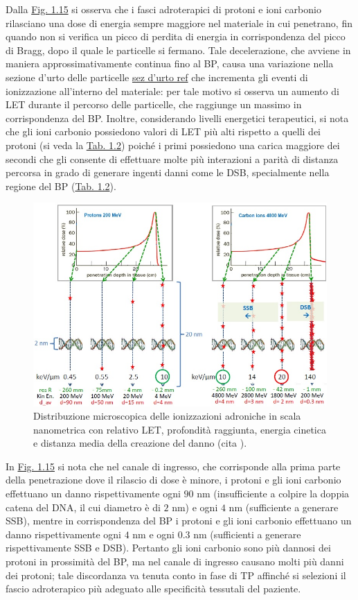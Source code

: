 \documentclass[12pt,a4paper,twoside]{report}
\begin{document}
	Dalla \hyperref[fig:proton_carbon_let]{Fig. 1.15} si osserva che i fasci adroterapici di protoni e ioni carbonio rilasciano una dose di energia sempre maggiore nel materiale in cui penetrano, fin quando non si verifica un picco di perdita di energia in corrispondenza del picco di Bragg, dopo il quale le particelle si fermano. Tale decelerazione, che avviene in maniera approssimativamente continua fino al BP, causa una variazione nella sezione d'urto delle particelle \hyperref[sez]{sez d'urto ref} che incrementa gli eventi di ionizzazione all'interno del materiale: per tale motivo si osserva un aumento di LET durante il percorso delle particelle, che raggiunge un massimo in corrispondenza del BP. Inoltre, considerando livelli energetici terapeutici, si nota che gli ioni carbonio possiedono valori di LET più alti rispetto a quelli dei protoni (si veda la \hyperref[tab:let_rbe]{Tab. 1.2}) poiché i primi possiedono una carica maggiore dei secondi che gli consente di effettuare molte più interazioni a parità di distanza percorsa in grado di generare ingenti danni come le DSB, specialmente nella regione del BP (\hyperref[tab:let_rbe]{Tab. 1.2}).
	
	\begin{figure}[H]
		\centering
		\includegraphics[width=0.9\linewidth]{proton_carbon_let.jpg}
		\caption{Distribuzione microscopica delle ionizzazioni adroniche in scala nanometrica con relativo LET, profondità raggiunta, energia cinetica e distanza media della creazione del danno (cita
			).}
		\label{fig:proton_carbon_let}
	\end{figure}
	
	In \hyperref[fig:proton_carbon_let]{Fig. 1.15} si nota che nel canale di ingresso, che corrisponde alla prima parte della penetrazione dove il rilascio di dose è minore, i protoni e gli ioni carbonio effettuano un danno rispettivamente ogni $90 \mbox{ nm}$ (insufficiente a colpire la doppia catena del DNA, il cui diametro è di $2 \mbox{ nm}$) e ogni $4 \mbox{ nm}$ (sufficiente a generare SSB), mentre in corrispondenza del BP i protoni e gli ioni carbonio effettuano un danno rispettivamente ogni $4 \mbox{ nm}$ e ogni $0.3 \mbox{ nm}$ (sufficienti a generare rispettivamente SSB e DSB). Pertanto gli ioni carbonio sono più dannosi dei protoni in prossimità del BP, ma nel canale di ingresso causano molti più danni dei protoni; tale discordanza va tenuta conto in fase di TP affinché si selezioni il fascio adroterapico più adeguato alle specificità tessutali del paziente.
	
\end{document}
